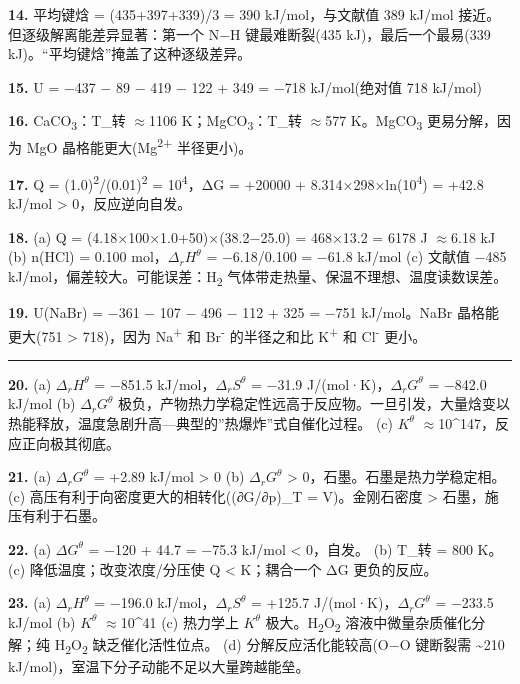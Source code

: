 \documentclass[a4paper,11pt]{ctexart}
\newcommand{\箭}{\ensuremath{\rightarrow}}
\newcommand{\左箭}{\ensuremath{\leftarrow}}
\newcommand{\上箭}{\ensuremath{\uparrow}}
\newcommand{\下箭}{\ensuremath{\downarrow}}
\newcommand{\衡}{\ensuremath{\rightleftharpoons}}
\newcommand{\双箭}{\ensuremath{\leftrightarrow}}
\newcommand{\约等于}{\ensuremath{\approx}}
\newcommand{\小于等于}{\ensuremath{\leq}}
\newcommand{\大于等于}{\ensuremath{\geq}}
\newcommand{\不等于}{\ensuremath{\neq}}
\newcommand{\西格马}{\ensuremath{\sigma}}
\newcommand{\派}{\ensuremath{\pi}}
\begin{document}
\textbf{14.} 平均键焓 = (435+397+339)/3 = 390 kJ/mol，与文献值 389 kJ/mol 接近。但逐级解离能差异显著：第一个 N−H 键最难断裂(435 kJ)，最后一个最易(339 kJ)。``平均键焓''掩盖了这种逐级差异。

\textbf{15.} U = −437 − 89 − 419 − 122 + 349 = −718 kJ/mol(绝对值 718 kJ/mol)

\textbf{16.} CaCO\textsubscript{3}：T\_转 \约等于 1106 K；MgCO\textsubscript{3}：T\_转 \约等于 577 K。MgCO\textsubscript{3} 更易分解，因为 MgO 晶格能更大(Mg\textsuperscript{2+} 半径更小)。

\textbf{17.} Q = (1.0)\textsuperscript{2}/(0.01)\textsuperscript{2} = 10\textsuperscript{4}，ΔG = +20000 + 8.314×298×ln(10\textsuperscript{4}) = +42.8 kJ/mol \textgreater{} 0，反应逆向自发。

\textbf{18.}
(a) Q = (4.18×100×1.0+50)×(38.2−25.0) = 468×13.2 = 6178 J \约等于 6.18 kJ
(b) n(HCl) = 0.100 mol，\(\Delta_r H^\theta\) = −6.18/0.100 = −61.8 kJ/mol
(c) 文献值 −485 kJ/mol，偏差较大。可能误差：H\textsubscript{2} 气体带走热量、保温不理想、温度读数误差。

\textbf{19.} U(NaBr) = −361 − 107 − 496 − 112 + 325 = −751 kJ/mol。NaBr 晶格能更大(751 \textgreater{} 718)，因为 Na\textsuperscript{+} 和 Br\textsuperscript{-} 的半径之和比 K\textsuperscript{+} 和 Cl\textsuperscript{-} 更小。

\begin{center}\rule{0.5\linewidth}{0.5pt}\end{center}

\textbf{20.}
(a) \(\Delta_r H^\theta\) = −851.5 kJ/mol，\(\Delta_r S^\theta\) = −31.9 J/(mol·K)，\(\Delta_r G^\theta\) = −842.0 kJ/mol
(b) \(\Delta_r G^\theta\) 极负，产物热力学稳定性远高于反应物。一旦引发，大量焓变以热能释放，温度急剧升高---典型的''热爆炸''式自催化过程。
(c) \(K^\theta\) \约等于 10\^{}147，反应正向极其彻底。

\textbf{21.}
(a) \(\Delta_r G^\theta\) = +2.89 kJ/mol \textgreater{} 0
(b) \(\Delta_r G^\theta\) \textgreater{} 0，石墨。石墨是热力学稳定相。
(c) 高压有利于向密度更大的相转化((∂G/∂p)\_T = V)。金刚石密度 \textgreater{} 石墨，施压有利于石墨。

\textbf{22.}
(a) \(\Delta G^\theta\) = −120 + 44.7 = −75.3 kJ/mol \textless{} 0，自发。
(b) T\_转 = 800 K。
(c) 降低温度；改变浓度/分压使 Q \textless{} K；耦合一个 ΔG 更负的反应。

\textbf{23.}
(a) \(\Delta_r H^\theta\) = −196.0 kJ/mol，\(\Delta_r S^\theta\) = +125.7 J/(mol·K)，\(\Delta_r G^\theta\) = −233.5 kJ/mol
(b) \(K^\theta\) \约等于 10\^{}41
(c) 热力学上 \(K^\theta\) 极大。H\textsubscript{2}O\textsubscript{2} 溶液中微量杂质催化分解；纯 H\textsubscript{2}O\textsubscript{2} 缺乏催化活性位点。
(d) 分解反应活化能较高(O−O 键断裂需 \textasciitilde210 kJ/mol)，室温下分子动能不足以大量跨越能垒。
\end{document}
